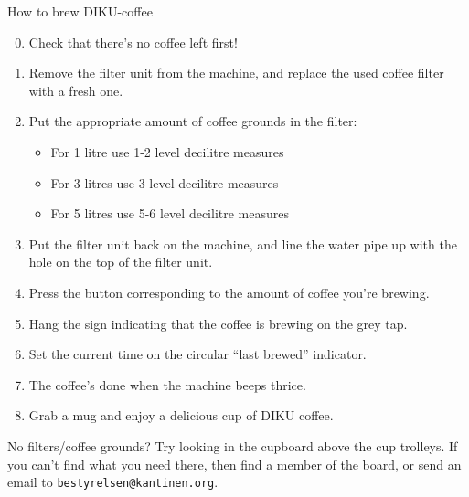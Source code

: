 \documentclass{article}
\begin{document}

\maketitle

\null
\vspace{-0.2cm}

\fontsize{18}{20}\selectfont

\vspace{-1.7cm}

\hspace{-0.9cm}\noindent How to brew DIKU-coffee

\vspace{1.5cm}

\begin{enumerate}

\setcounter{enumi}{-1}

\itemsep-0.1cm

\item Check that there's no coffee left first!

\item Remove the filter unit from the machine, and replace the used coffee
filter with a fresh one.

\item Put the appropriate amount of coffee grounds in the filter:

\begin{itemize}

\bfseries

\item For 1 litre use 1-2 level decilitre measures

\item For 3 litres use 3 level decilitre measures

\item For 5 litres use 5-6 level decilitre measures

\end{itemize}

\item Put the filter unit back on the machine, and line the water pipe up with
the hole on the top of the filter unit.

\item Press the button corresponding to the amount of coffee you're brewing.

\item Hang the sign indicating that the coffee is brewing on the grey tap.

\item Set the current time on the circular ``last brewed'' indicator.

\item The coffee's done when the machine beeps thrice.

\item Grab a mug and enjoy a delicious cup of DIKU coffee.

\end{enumerate}

\vspace{0.2cm}

\begin{center}
\LARGE

No filters/coffee grounds? Try looking in the cupboard above the cup trolleys.
If you can't find what you need there, then find a member of the board, or send
an email to \texttt{bestyrelsen@kantinen.org}.

\end{center}

\underskriv
\end{document}
